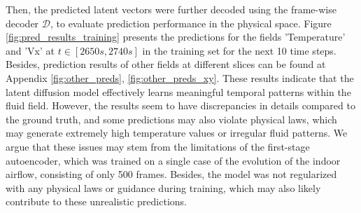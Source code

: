 \documentclass[final-report]{article-template}
\begin{document}
Then, the predicted latent vectors were further decoded using the frame-wise decoder $\mathcal{D}$, to evaluate prediction performance in the physical space. Figure \ref{fig:pred_results_training} presents the predictions for the fields 'Temperature' and 'Vx' at $t \in [2650s, 2740s]$ in the training set for the next 10 time steps. Besides, prediction results of other fields at different slices can be found at Appendix \ref{fig:other_preds}, \ref{fig:other_preds_xy}. These results indicate that the latent diffusion model effectively learns meaningful temporal patterns within the fluid field. However, the results seem to have discrepancies in details compared to the ground truth, and some predictions may also violate physical laws, which may generate extremely high temperature values or irregular fluid patterns. We argue that these issues may stem from the limitations of the first-stage autoencoder, which was trained on a single case of the evolution of the indoor airflow, consisting of only 500 frames. Besides, the model was not regularized with any physical laws or guidance during training, which may also likely contribute to these unrealistic predictions. \\
\end{document}
